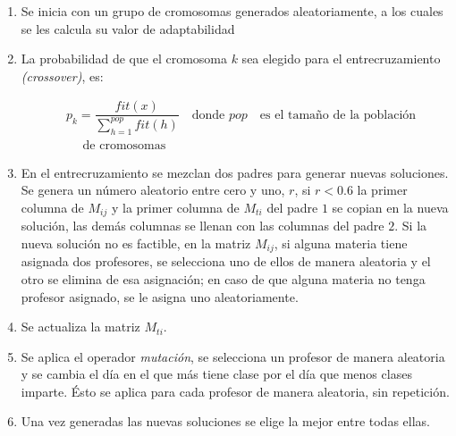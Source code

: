 \begin{enumerate}
\item Se inicia con un grupo de cromosomas generados aleatoriamente, a los cuales se les calcula su valor de adaptabilidad

\item La probabilidad de que el cromosoma $k$ sea elegido para el entrecruzamiento \textit{(crossover)}, es:
  
\begin{equation*}
\begin{split}
&p_{k} = \dfrac{fit(x)}{\displaystyle \sum_{h = 1}^{pop} fit(h)} \,\,\,\, \text{ donde } pop \,\,\,\, \text{ es el tamaño de la población}\\
&\quad \text{ de cromosomas }
\end{split}
\end{equation*}


\item En el entrecruzamiento se mezclan dos padres para generar nuevas soluciones. Se genera un número aleatorio entre cero y uno, $r$, si $r < 0.6$  la primer columna de $M_{ij}$ y la primer columna de $M_{ti}$ del padre $1$ se copian en la nueva solución, las demás columnas se llenan con las columnas del padre $2$. Si la nueva solución no es factible, en la matriz $M_{ij}$, si alguna materia tiene asignada dos profesores, se selecciona uno de ellos de manera aleatoria y el otro se elimina de esa asignación; en caso de que alguna materia no tenga profesor asignado, se le asigna uno aleatoriamente.

\item Se actualiza la matriz $M_{ti}$.

\item Se aplica el operador \textit{mutación}, se selecciona un profesor de manera aleatoria y se cambia el día en el que más tiene clase por el día que menos clases imparte. Ésto se aplica para cada profesor de manera aleatoria, sin repetición.

\item Una vez generadas las nuevas soluciones se elige la mejor entre todas ellas.
\end{enumerate}
